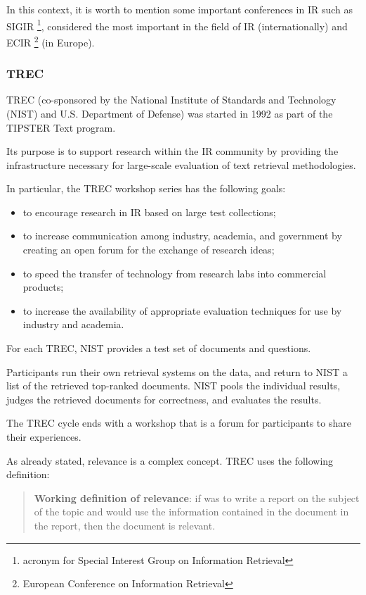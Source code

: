 In this context, it is worth to mention some important conferences in IR such as SIGIR \footnote{acronym for Special Interest Group on Information Retrieval}, considered the most important in the field of IR (internationally) and ECIR \footnote{European Conference on Information Retrieval} (in Europe).

\subsubsection{TREC}

TREC (co-sponsored by the National Institute of Standards and Technology (NIST) and U.S. Department of Defense) was started in 1992 as part of the TIPSTER Text program.

Its purpose is to support research within the IR community by providing the infrastructure necessary for large-scale evaluation of text retrieval methodologies.

In particular, the TREC workshop series has the following goals:

\begin{itemize}
 \item to encourage research in IR based on large test collections;
 \item to increase communication among industry, academia, and government by
creating an open forum for the exchange of research ideas;
 \item to speed the transfer of technology from research labs into commercial
products;
 \item to increase the availability of appropriate evaluation techniques for
use by industry and academia.
\end{itemize}

For each TREC, NIST provides a test set of documents and questions.

Participants run their own retrieval systems on the data, and return to NIST a
list of the retrieved top-ranked documents. NIST pools the individual results,
judges the retrieved documents for correctness, and evaluates the results.

The TREC cycle ends with a workshop that is a forum for participants to share
their experiences.

As already stated, relevance is a complex concept. TREC uses the following definition:

\begin{quote}
\textbf{Working definition of relevance}: if was to write a report on the subject of the topic and would use the information contained in the document in the report, then the document is relevant.
\end{quote}

